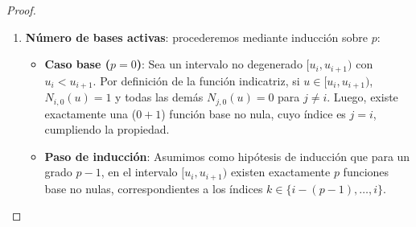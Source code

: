 \documentclass[11pt]{book}
\theoremstyle{plain} %
\theoremstyle{definition} %
\theoremstyle{definition} %
\begin{document}
\begin{proof}
\begin{enumerate}
\begin{itemize}
            \end{itemize}
            \item \textbf{Número de bases activas}: procederemos mediante inducción sobre $p$:
                \begin{itemize}
                    \item \textbf{Caso base ($p=0$)}: Sea un intervalo no degenerado $[u_i, u_{i+1})$ con $u_i < u_{i+1}$. Por definición de la función indicatriz, si $u \in [u_i, u_{i+1})$, $N_{i,0}(u) = 1$ y todas las demás $N_{j,0}(u) = 0$ para $j \neq i$. Luego, existe exactamente una ($0+1$) función base no nula, cuyo índice es $j=i$, cumpliendo la propiedad.
                    
                    \item \textbf{Paso de inducción}: Asumimos como hipótesis de inducción que para un grado $p-1$, en el intervalo $[u_i, u_{i+1})$ existen exactamente $p$ funciones base no nulas, correspondientes a los índices $k \in \{i-(p-1), \dots, i\}$. 
                    

\end{itemize}
\end{enumerate}
\end{proof}
\end{document}
